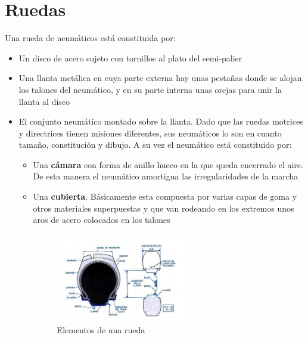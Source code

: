 \documentclass[a4paper,12pt,oneside]{book}
\begin{document}
\section{Ruedas}
\label{sec:orgf783b5b}

Una rueda de neumáticos está constituida por:
\begin{itemize}
\item Un disco de acero sujeto con tornillos al plato del semi-palier
\item Una llanta metálica en cuya parte externa hay unas pestañas donde se alojan
los talones del neumático, y en su parte interna unas orejas para unir la
llanta al disco
\item El conjunto neumático montado sobre la llanta. Dado que las ruedas motrices y
directrices tienen misiones diferentes, sus neumáticos lo son en cuanto
tamaño, constitución y dibujo. A su vez el neumático está constituido por:
\begin{itemize}
\item Una \textbf{cámara} con forma de anillo hueco en la que queda encerrado el
aire. De esta manera el neumático amortigua las irregularidades de la marcha
\item Una \textbf{cubierta}. Básicamente esta compuesta por varias capas de
goma y otros materiales superpuestas y que van rodeando en los extremos unos
aros de acero colocados en los talones 

\begin{figure}[htbp]
\centering
\includegraphics[width=0.6\textwidth]{./img_0009/esquema_rueda.PNG}
\caption{Elementos de una rueda}
\end{figure}
\end{itemize}
\end{itemize}
\end{document}
